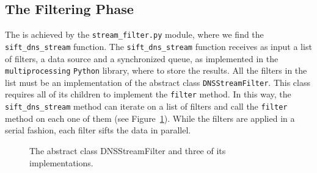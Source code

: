 

\subsection{The Filtering Phase} %
\label{sub:impl_the_filtering_phase}
The  is achieved by the \texttt{stream\_filter.py} module, where
we find the \texttt{sift\_dns\_stream} function. The
\texttt{sift\_dns\_stream} function receives as input a list of filters, a data
source and a synchronized queue, as implemented in the \texttt{multiprocessing}
\texttt{Python} library, where to store the results. All the filters in the list must be an
implementation of the abstract class \texttt{DNSStreamFilter}. This class requires
all of its children to implement the \texttt{filter} method. In this way, the
\texttt{sift\_dns\_stream} method can iterate on a list of filters and call the
\texttt{filter} method on each one of them (see Figure~\ref{fig:dns_stream_class}).
While the filters are applied in a serial fashion, each filter sifts the data in
parallel.
\begin{figure}[!htp]
    \centering
    \caption{The abstract class DNSStreamFilter and three of its implementations.}
    \label{fig:dns_stream_class}
\end{figure}

